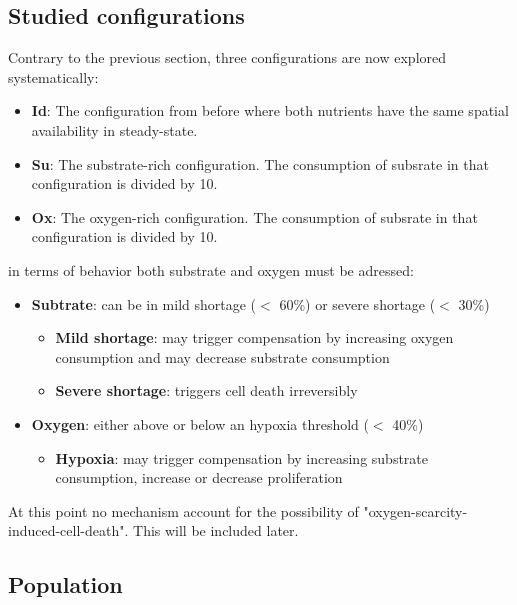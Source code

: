\documentclass[11pt,a4paper]{article}
\begin{document}
\subsection{Studied configurations}
Contrary to the previous section, three configurations are now explored systematically:
\begin{itemize}
\item \textbf{Id}: The configuration from before where both nutrients have the same spatial availability in steady-state.
\item \textbf{Su}: The substrate-rich configuration. The consumption of subsrate in that configuration is divided by 10.
\item \textbf{Ox}: The oxygen-rich configuration. The consumption of subsrate in that configuration is divided by 10.
\end{itemize}

in terms of behavior both substrate and oxygen must be adressed:
\begin{itemize}
\item \textbf{Subtrate}: can be in mild shortage ($<$ 60\%) or severe shortage ($<$ 30\%)

\begin{itemize}
\item \textbf{Mild shortage}: may trigger compensation by increasing oxygen consumption and may decrease substrate consumption
\item \textbf{Severe shortage}: triggers cell death irreversibly
\end{itemize}

\item  \textbf{Oxygen}: either above or below an hypoxia threshold ($<$ 40\%)
\begin{itemize}
\item \textbf{Hypoxia}: may trigger compensation by increasing substrate consumption, increase or decrease proliferation
\end{itemize}
\end{itemize}

At this point no mechanism account for the possibility of "oxygen-scarcity-induced-cell-death". This will be included later.

\subsection{Population}



\newpage


\end{document}
